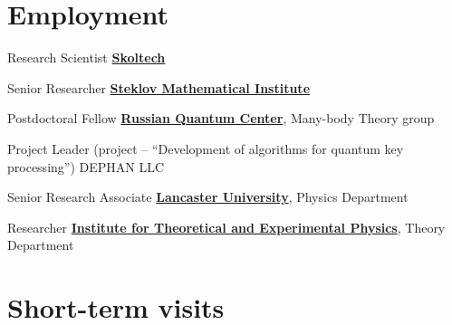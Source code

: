 \documentclass[10pt,a4paper,sans]{moderncv}
\begin{document}
\section{Employment}

	{Research Scientist}{}
	{\textbf{\textcolor{blue}{\href{http://www.skoltech.ru/}{Skoltech}}}}{}{}

	{Senior Researcher}{}
	{\textbf{\textcolor{blue}{\href{http://www.mi.ras.ru/index.php?c=&l=1}{Steklov Mathematical Institute}}}}{}{}


	{Postdoctoral Fellow}{}
	{\textbf{\textcolor{blue}{\href{http://rqc.ru}{Russian Quantum Center}}},  Many-body Theory group}{}{}

	{Project Leader (project -- ``Development of algorithms for quantum key processing'')}{}
	{DEPHAN LLC}{}{}

	{Senior Research Associate}{}
	{\textbf{\textcolor{blue}{\href{http://www.lancaster.ac.uk}{Lancaster University}}},  Physics Department}{}{}

	{Researcher}{}
	{\textbf{\textcolor{blue}{\href{http://www.itep.ru/}{Institute for Theoretical and Experimental Physics}}},  Theory Department}{}{}

\section{Short-term visits}







	
\end{document}
